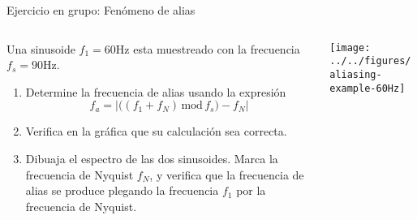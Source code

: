 \documentclass[presentation,aspectratio=169]{beamer}
\begin{document}
\begin{frame}[label={sec:org94ee74f}]{Ejercicio en grupo: Fenómeno de alias}
\begin{columns}
\begin{column}{0.4\columnwidth}
Una sinusoide \(f_1=60\)Hz esta muestreado con la frecuencia \(f_s=90\)Hz.

\begin{enumerate}
\item Determine la frecuencia de alias usando la expresión
\[ f_a = \left| \big( (f_1 + f_N) \, \text{mod}\, f_s\big) - f_N\right|\]
\item Verifica en la gráfica que su calculación sea correcta.
\item Dibuaja el espectro de las dos sinusoides. Marca la frecuencia de Nyquist \(f_N\), y verifica que la frecuencia de alias se produce plegando la frecuencia \(f_1\) por la frecuencia de Nyquist.
\end{enumerate}
\end{column}

\begin{column}{0.6\columnwidth}
\texttt{[image: ../../figures/aliasing-example-60Hz]}
\end{column}
\end{columns}
\end{frame}
\end{document}
